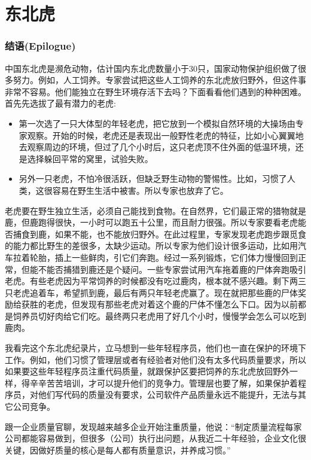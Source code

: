 \chapter{东北虎} %

\hypertarget{epilogue-ux7ed3ux8bed}{%
\subsection{结语(Epilogue)}\label{epilogue-ux7ed3ux8bed}}

中国东北虎是濒危动物，估计国内东北虎数量小于30只，国家动物保护组织做了很多努力。例如，人工饲养。专家尝试把这些人工饲养的东北虎放归野外，但这件事非常不容易。他们能独立在野生环境存活下去吗？下面看看他们遇到的种种困难。\\
首先先选拔了最有潜力的老虎:

\begin{itemize}
\tightlist
\item
  第一次选了一只大体型的年轻老虎，把它放到一个模拟自然环境的大操场由专家观察。开始的时候，老虎还是表现出一般野性老虎的特征，比如小心翼翼地去观察周边的环境，但过了几个小时后，这只老虎顶不住外面的低温环境，还是选择躲回平常的窝里，试验失败。
\item
  另外一只老虎，不怕冷很活跃，但缺乏野生动物的警惕性。比如，习惯了人类，这很容易在野生生活中被害。所以专家也放弃了它。
\end{itemize}

老虎要在野生独立生活，必须自己能找到食物。在自然界，它们最正常的猎物就是鹿，但鹿跑得很快，一小时可以跑五十公里，而且耐力很强。所以专家要看老虎能否捕食到鹿，如果不能，也不能放归野外。在此过程里，专家发现老虎跑步跟觅食的能力都比野生的差很多，太缺少运动。所以专家为他们设计很多运动，比如用汽车拉着轮胎，插上一些鲜肉，引它们奔跑。经过一系列锻炼，它们体力慢慢回到正常，但能不能否捕猎到鹿还是个疑问。一些专家尝试用汽车拖着鹿的尸体奔跑吸引老虎。有些老虎因为平常饲养的时候都没有吃过鹿肉，根本就不感兴趣。剩下两三只老虎追着车，希望抓到鹿，最后有两只年轻老虎赢了。现在就把那些鹿的尸体奖励给获胜的老虎，但发现有那些老虎对着这个鹿的尸体不懂怎么下口。因为以前都是饲养员切好肉给它们吃。最终两只老虎用了好几个小时，慢慢学会怎么可以吃到鹿肉。

我看完这个东北虎纪录片，立马想到一些年轻程序员，他们也一直在保护的环境下工作。例如，他们习惯了管理层或者有经验者对他们没有太多代码质量要求，所以如果要这些年轻程序员注重代码质量，就跟保护区要把饲养的东北虎放回野外一样，得辛辛苦苦培训，才可以提升他们的竞争力。管理层也要了解，如果保护着程序员，对他们写代码的质量没有要求，公司软件产品质量永远不能提升，无法与其它公司竞争。

跟一企业质量官聊，发现越来越多企业开始注重质量，他说：``制定质量流程每家公司都能容易做到，但很多（公司）执行出问题，从我近二十年经验，企业文化很关键，因做好质量的核心是每人都有质量意识，并养成习惯。''




